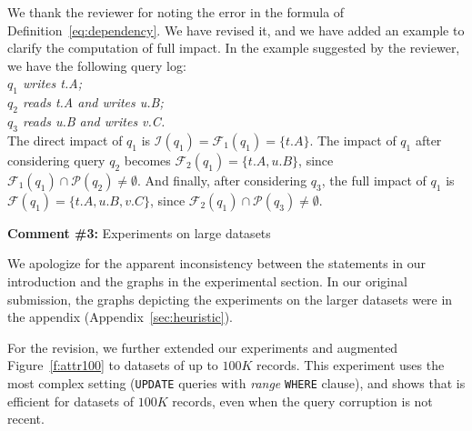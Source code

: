We thank the reviewer for noting the error in the formula of
Definition~\ref{eq:dependency}. We have revised it, and we have added an
example to clarify the computation of full impact.
In the example suggested by the reviewer, we have the following query log: \\
\textit{\indent $q_1$ writes t.A; \\
\indent $q_2$ reads t.A and writes u.B; \\
\indent $q_3$ reads u.B and writes v.C.}\\
The direct impact of $q_1$ is $\mathcal{I}(q_1)=\mathcal{F}_1(q_1) = \{t.A\}$.
The impact of $q_1$ after considering query $q_2$ becomes $\mathcal{F}_2(q_1)
= \{t.A, u.B\}$, since $\mathcal{F}_1(q_1) \cap\mathcal{P}(q_2) \neq
\emptyset$. And finally, after considering $q_3$, the full impact of $q_1$ is
$\mathcal{F}(q_1)=\{t.A, u.B, v.C\}$, since $\mathcal{F}_2(q_1)
\cap\mathcal{P}(q_3) \neq \emptyset$.




\comskip

\noindent
\textbf{Comment \#3:} Experiments on large datasets
\begin{quote}
\end{quote}

We apologize for the apparent inconsistency between the statements in our
introduction and the graphs in the experimental section. In our original
submission, the graphs depicting the experiments on the larger datasets were
in the appendix (Appendix~\ref{sec:heuristic}).

For the revision, we further extended our experiments and augmented
Figure~\ref{f:attr100} to datasets of up to $100K$ records. This experiment
uses the most complex setting (\texttt{UPDATE} queries with \textit{range}
\texttt{WHERE} clause), and shows that \sys is efficient for datasets of
$100K$ records, even when the query corruption is not recent.

